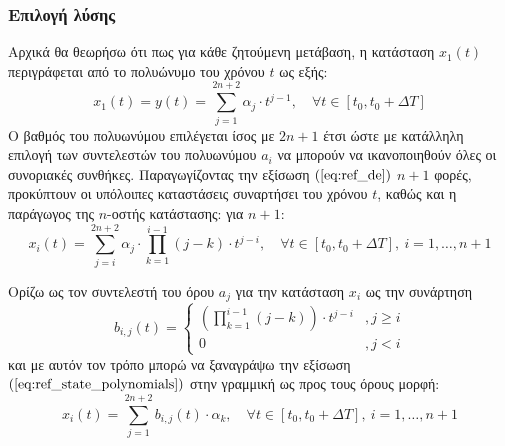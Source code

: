 \subsubsection{Επιλογή λύσης}
Αρχικά θα θεωρήσω ότι πως για κάθε ζητούμενη μετάβαση, η κατάσταση $x_1(t)$ περιγράφεται από το πολυώνυμο του χρόνου $t$ ως εξής:
\begin{equation}
	x_1(t) = y(t) = \sum_{j=1}^{2n + 2} \alpha_j \cdot t^{j-1},\quad \forall t \in [t_0,t_0+\Delta T]
	\label{eq:ref_de}
\end{equation}
Ο βαθμός του πολυωνύμου επιλέγεται ίσος με $2n + 1$ έτσι ώστε με κατάλληλη επιλογή των συντελεστών του πολυωνύμου $a_i$ να μπορούν να ικανοποιηθούν όλες οι συνοριακές συνθήκες. Παραγωγίζοντας την εξίσωση $(\ref{eq:ref_de})$ $n+1$ φορές, προκύπτουν οι υπόλοιπες καταστάσεις συναρτήσει του χρόνου $t$, καθώς και η παράγωγος της $n$-οστής κατάστασης: για $n+1$: 
\begin{equation}
x_i(t) = \sum_{j=i}^{2n + 2} \alpha_j \cdot \prod_{k = 1}^{i-1} (j-k) 
 \cdot t^{j-i},\quad \forall t \in [t_0,t_0+\Delta T], \: i = 1,\dots, n+1
\label{eq:ref_state_polynomials}
\end{equation}

Ορίζω ως τον συντελεστή του όρου $a_j$ για την κατάσταση $x_i$ ως την συνάρτηση
\begin{equation}
	b_{i,j}(t) = \begin{cases}
	\left( \prod_{k = 1}^{i-1} (j-k) \right)
	\cdot t^{j-i} &, j \geq i \\
	0 &, j < i 
	\end{cases}
	\label{eq:ref_system_coefficients}
\end{equation}
και με αυτόν τον τρόπο μπορώ να ξαναγράψω την εξίσωση $(\ref{eq:ref_state_polynomials})$ στην γραμμική ως προς τους όρους μορφή:
\begin{equation}
x_i(t) = \sum_{j=1}^{2n + 2} b_{i,j}(t) \cdot \alpha_k 
,\quad \forall t \in [t_0,t_0+\Delta T], \: i = 1,\dots, n+1
\end{equation}

